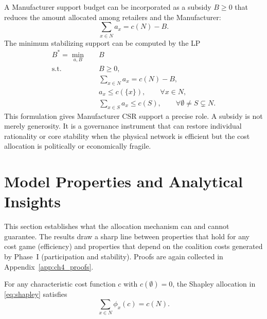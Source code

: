 A Manufacturer support budget can be incorporated as a subsidy $B\geq 0$ that reduces the amount allocated among retailers and the Manufacturer:
\begin{equation}
\label{eq:ch4_subsidized_allocation}
\sum_{x\in N}a_x=c(N)-B.
\end{equation}
The minimum stabilizing support can be computed by the LP
\begin{equation}
\label{eq:ch4_min_subsidy}
\begin{aligned}
B^*=\min_{a,B}\quad & B\\
\text{s.t.}\quad
& B\geq 0,\\
& \sum_{x\in N}a_x=c(N)-B,\\
& a_x\leq c(\{x\}), \qquad \forall x\in N,\\
& \sum_{x\in S}a_x\leq c(S), \qquad \forall \emptyset\neq S\subsetneq N.
\end{aligned}
\end{equation}
This formulation gives Manufacturer CSR support a precise role. A subsidy is not merely generosity. It is a governance instrument that can restore individual rationality or core stability when the physical network is efficient but the cost allocation is politically or economically fragile.

\section{Model Properties and Analytical Insights}
\label{sec:properties}

This section establishes what the allocation mechanism can and cannot guarantee. The results draw a sharp line between properties that hold for any cost game (efficiency) and properties that depend on the coalition costs generated by Phase~I (participation and stability). Proofs are again collected in Appendix~\ref{app:ch4_proofs}.

\begin{proposition}
\label{prop:ch4_efficiency}
For any characteristic cost function $c$ with $c(\emptyset)=0$, the Shapley allocation in \eqref{eq:shapley} satisfies
\begin{equation}
\label{eq:ch4_shapley_efficiency}
\sum_{x\in N}\phi_x(c)=c(N).
\end{equation}
\end{proposition}

